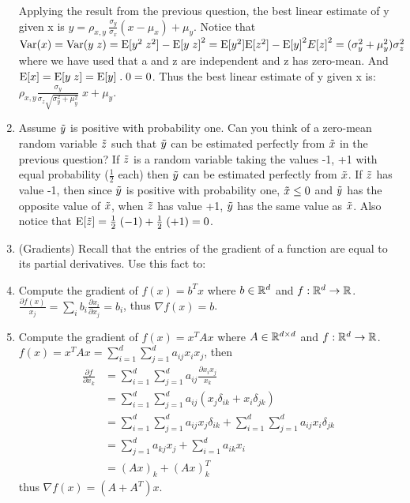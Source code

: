 \documentclass[10pt]{article}
\begin{document}
\begin{enumerate}
	Applying the result from the previous question, the best linear estimate of y given x is $y = \rho_{x,y}\, \frac{\sigma_y}{\sigma_x} (x - \mu_x)  + \mu_y$.
	Notice that $\mathrm{Var}{(x)} = \mathrm{Var}{(y \; z)} = \mathrm{E}{[y^2 \; z^2]} - \mathrm{E}{[y \; z]}^2 = \mathrm{E}{[y^2]}  \mathrm{E}{[z^2]} - \mathrm{E}{[y]}^2  E{[z]}^2 = (\sigma_y^2 + \mu_y^2) \sigma_z^2$ where we have used that a and z are independent and z has zero-mean. And $\mathrm{E}{[x]} = \mathrm{E}[y \; z] = \mathrm{E}[y] \; . \; 0 = 0$. Thus the  best linear estimate of y given x is: $\rho_{x,y} \frac{\sigma_y} {\sigma_z \sqrt{\sigma_y^2 + \mu_y^2}} \; x + \mu_y$.
	 
	 \item Assume $\tilde{  y }$ is positive with probability one. Can you think of a zero-mean random variable $\tilde{ z }$ such that $\tilde{  y }$ can be estimated perfectly from $\tilde{  x }$ in the previous question? If $\tilde{ z }$ is a random variable taking the values -1, +1 with equal probability ($\frac{1}{2}$ each) then $\tilde{  y }$ can be estimated perfectly from $\tilde{  x }$. If $\tilde{ z }$ has value -1, then since $\tilde{  y }$ is positive with probability one, $\tilde{  x } \le 0$  and $\tilde{  y }$ has the opposite value of $\tilde{  x }$, when  $\tilde{ z }$ has value +1, $\tilde{  y }$ has the same value as $\tilde{  x }$. Also notice that $\mathrm{E}[\tilde{ z }] = \frac{1}{2} \; (-1) + \frac{1}{2} \; (+1) = 0$.
	 
\ee

\item (Gradients)
Recall that the entries of the gradient of a function are equal to its partial derivatives. Use this fact to: 

\be
	\item Compute the gradient of $f(x) = b^T x$ where $b \in \mathbb{R}^{d}$ and $f: \mathbb{R}^{d} \rightarrow \mathbb{R} $.
	$\frac{\partial f(x)}{x_j} = \sum_i b_i \frac{\partial x_i} {\partial x_j} = b_i$, thus $\nabla f(x) = b$.
	\item Compute the gradient of $f(x) = x^T A x$ where $A \in \mathbb{R}^{d\times d}$ and $f: \mathbb{R}^{d} \rightarrow \mathbb{R} $.
	$f(x)	=  x^T A x = \sum_{i=1}^d \sum_{j=1}^d a_{ij} x_i x_j$, then
	\begin{align*}
		\frac{\partial f} {\partial x_k}	&=	\sum_{i=1}^d \sum_{j=1}^d a_{ij} \frac {\partial x_i x_j} {x_k}\\
								&=	\sum_{i=1}^d \sum_{j=1}^d a_{ij} (x_j \delta_{ik} + x_i \delta_{jk}) \\
								&=	\sum_{i=1}^d \sum_{j=1}^d a_{ij} x_j \delta_{ik}  + \sum_{i=1}^d \sum_{j=1}^d a_{ij} x_i \delta_{jk} \\
								&=	\sum_{j=1}^d  a_{kj} x_j +  \sum_{i=1}^d a_{ik}  x_i \\
								&=	(A x)_k + (A x)_k^T
	\end{align*}
	thus $\nabla f(x) = (A + A^T) x$.
\ee

\end{enumerate}
\end{document}
